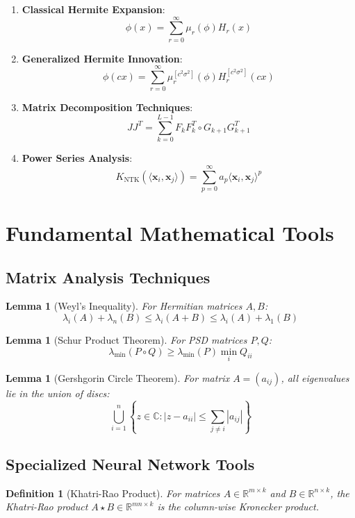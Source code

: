 \documentclass{article}
\newtheorem{lemma}[theorem]{Lemma}
\newtheorem{definition}[theorem]{Definition}
\newcommand{\R}{\mathbb{R}}
\newcommand{\C}{\mathbb{C}}
\newcommand{\evmin}[1]{\lambda_{\min}\left(#1\right)}
\newcommand{\x}{\mathbf{x}}
\begin{document}
\begin{enumerate}
    \item \textbf{Classical Hermite Expansion}:
    $$\phi(x) = \sum_{r=0}^{\infty} \mu_r(\phi) H_r(x)$$
    
    \item \textbf{Generalized Hermite Innovation}:
    $$\phi(cx) = \sum_{r=0}^{\infty} \mu_r^{[c^2\sigma^2]}(\phi) H_r^{[c^2\sigma^2]}(cx)$$
    
    \item \textbf{Matrix Decomposition Techniques}:
    $$JJ^T = \sum_{k=0}^{L-1} F_k F_k^T \circ G_{k+1} G_{k+1}^T$$
    
    \item \textbf{Power Series Analysis}:
    $$K_{\text{NTK}}(\langle \x_i, \x_j \rangle) = \sum_{p=0}^{\infty} a_p \langle \x_i, \x_j \rangle^p$$
\end{enumerate}

\section{Fundamental Mathematical Tools}

\subsection{Matrix Analysis Techniques}

\begin{lemma}[Weyl's Inequality]
For Hermitian matrices $A, B$:
$$\lambda_i(A) + \lambda_n(B) \leq \lambda_i(A + B) \leq \lambda_i(A) + \lambda_1(B)$$
\end{lemma}

\begin{lemma}[Schur Product Theorem]
For PSD matrices $P, Q$:
$$\evmin{P \circ Q} \geq \evmin{P} \min_i Q_{ii}$$
\end{lemma}

\begin{lemma}[Gershgorin Circle Theorem]
For matrix $A = (a_{ij})$, all eigenvalues lie in the union of discs:
$$\bigcup_{i=1}^n \left\{z \in \C : |z - a_{ii}| \leq \sum_{j \neq i} |a_{ij}|\right\}$$
\end{lemma}

\subsection{Specialized Neural Network Tools}

\begin{definition}[Khatri-Rao Product]
For matrices $A \in \R^{m \times k}$ and $B \in \R^{n \times k}$, the Khatri-Rao product $A \star B \in \R^{mn \times k}$ is the column-wise Kronecker product.
\end{definition}
\end{document}

